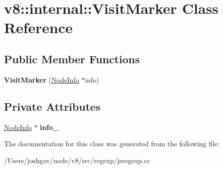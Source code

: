 \hypertarget{classv8_1_1internal_1_1_visit_marker}{}\section{v8\+:\+:internal\+:\+:Visit\+Marker Class Reference}
\label{classv8_1_1internal_1_1_visit_marker}
\subsection*{Public Member Functions}
\begin{DoxyCompactItemize}
\item 
{\bfseries Visit\+Marker} (\hyperlink{structv8_1_1internal_1_1_node_info}{Node\+Info} $\ast$info)\hypertarget{classv8_1_1internal_1_1_visit_marker_aaab40ec219c01202a8effd592f8922b1}{}\label{classv8_1_1internal_1_1_visit_marker_aaab40ec219c01202a8effd592f8922b1}

\end{DoxyCompactItemize}
\subsection*{Private Attributes}
\begin{DoxyCompactItemize}
\item 
\hyperlink{structv8_1_1internal_1_1_node_info}{Node\+Info} $\ast$ {\bfseries info\+\_\+}\hypertarget{classv8_1_1internal_1_1_visit_marker_a73567c5d63f863c3160f46b39edd4ba2}{}\label{classv8_1_1internal_1_1_visit_marker_a73567c5d63f863c3160f46b39edd4ba2}

\end{DoxyCompactItemize}


The documentation for this class was generated from the following file\+:\begin{DoxyCompactItemize}
\item 
/\+Users/joshgav/node/v8/src/regexp/jsregexp.\+cc\end{DoxyCompactItemize}

